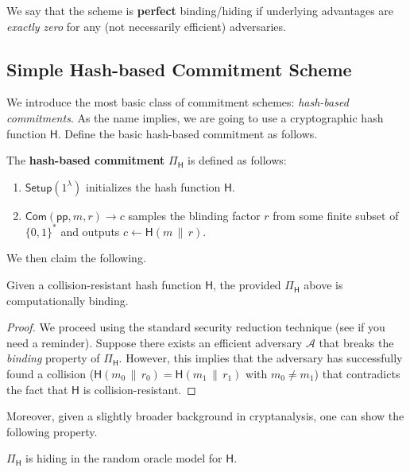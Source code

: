\documentclass[../../book]{subfiles}
\begin{document}
\begin{remark}
    We say that the scheme is \textbf{perfect} binding/hiding if underlying advantages are \emph{exactly zero} for any (not necessarily efficient) adversaries.
\end{remark}

\subsection{Simple Hash-based Commitment Scheme}

We introduce the most basic class of commitment schemes: \emph{hash-based commitments}.
As the name implies, we are going to use a cryptographic hash function \(\mathsf{H}\).
Define the basic hash-based commitment as follows.

\begin{definition}\label{def:hash-based-commitment}
    The \textbf{hash-based commitment} $\Pi_{\mathsf{H}}$ is defined as follows:
    \begin{enumerate}
        \item $\mathsf{Setup}(1^{\lambda})$ initializes the hash function $\mathsf{H}$.
        \item $\mathsf{Com}(\mathsf{pp}, m, r) \to c$ samples the blinding factor $r$ from some finite subset of $\{0,1\}^*$ and outputs $c \gets \mathsf{H}(m \,\|\, r)$.
    \end{enumerate}
\end{definition}

We then claim the following.

\begin{lemma}
    Given a collision-resistant hash function $\mathsf{H}$, the provided $\Pi_{\mathsf{H}}$ above is computationally binding.
\end{lemma}

\begin{proof}
    We proceed using the standard security reduction technique (see  if you need a reminder).
    Suppose there exists an efficient adversary $\mathcal{A}$ that breaks the \emph{binding} property of $\Pi_{\mathsf{H}}$.
    However, this implies that the adversary has successfully found a collision ($\mathsf{H}(m_0\,\|\, r_0) = \mathsf{H}(m_1\,\|\, r_1)$ with $m_0 \neq m_1$) that contradicts the fact that $\mathsf{H}$ is collision-resistant.
\end{proof}

Moreover, given a slightly broader background in cryptanalysis, one can show the following property.
\begin{lemma}
    $\Pi_{\mathsf{H}}$ is hiding in the random oracle model for $\mathsf{H}$.
\end{lemma}
\end{document}
